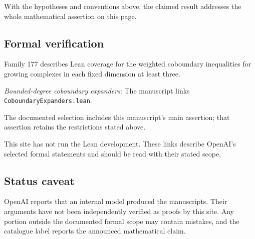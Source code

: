 \documentclass[11pt]{article}
\begin{document}
With the hypotheses and conventions above, the claimed result addresses the whole mathematical assertion on this page.

\subsection{Formal verification}
Family 177 describes Lean coverage for the weighted coboundary inequalities for growing complexes in each fixed dimension at least three.

\textit{Bounded-degree coboundary expanders}: The manuscript links \texttt{CoboundaryExpanders.lean}.

The documented selection includes this manuscript’s main assertion; that assertion retains the restrictions stated above.

This site has not run the Lean development. These links describe OpenAI’s selected formal statements and should be read with their stated scope.

\subsection{Status caveat}
OpenAI reports that an internal model produced the manuscripts. Their arguments have not been independently verified as proofs by this site. Any portion outside the documented formal scope may contain mistakes, and the catalogue label reports the announced mathematical claim.
\end{document}
